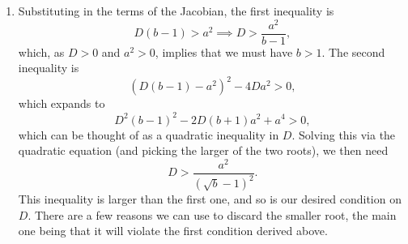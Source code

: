 \documentclass[a4paper,12pt]{article}
\begin{document}
\begin{enumerate}
{\begin{enumerate}[label=(\alph*)]
            \item
            Substituting in the terms of the Jacobian, the first inequality
            is
            \[
                D(b-1)>a^2
                \implies
                D>\frac{a^2}{b-1},
            \]
            which, as $D>0$ and $a^2>0$, implies that we must have $b>1$.
            The second inequality is
            \[
                (D(b-1)-a^2)^2-4Da^2>0,
            \]
            which expands to
            \[
                D^2(b-1)^2-2D(b+1)a^2+a^4>0,
            \]
            which can be thought of as a quadratic inequality in $D$.
            Solving this via the quadratic equation (and picking the larger
            of the two roots), we then need
            \[
                D>\frac{a^2}{(\sqrt{b}-1)^2}.
            \]
            This inequality is larger than the first one, and so is our
            desired condition on $D$. There are a few reasons we can use to
            discard the smaller root, the main one being that it will
            violate the first condition derived above.


        \end{enumerate}
    }



\end{enumerate}
\end{document}
